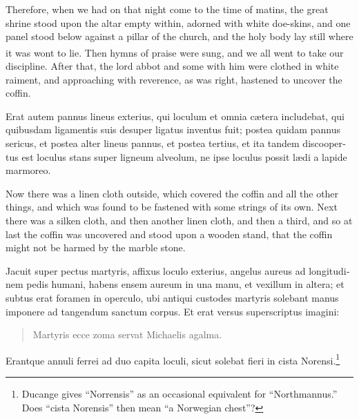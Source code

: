 \documentclass[10pt]{book}
\newcounter{engnote}
\newcommand{\engnotenum}{\textsuperscript{\arabic{engnote}\stepcounter{engnote}}}
\begin{document}
\begin{paracol}{2}
\switchcolumn

Therefore, when we had on that night come to the time of matins, the great shrine stood upon the altar empty within, adorned with white doe-skins, and one panel stood below against a pillar of the church, and the holy body lay still where it was wont to lie.\engnotenum{} Then hymns of praise were sung, and we all went to take our discipline. After that, the lord abbot and some with him were clothed in white raiment, and approaching with reverence, as was right, hastened to uncover the coffin.

\switchcolumn*

\begin{otherlanguage}{latin}
Erat autem pannus lineus exterius, qui loculum et omnia c\ae{}tera includebat, qui quibusdam ligamentis suis desuper ligatus inventus fuit; postea quidam pannus sericus, et postea alter lineus pannus, et postea tertius, et ita tandem discoopertus est loculus stans super ligneum alveolum, ne ipse loculus possit l\ae{}di a lapide marmoreo.
\end{otherlanguage}

\switchcolumn

Now there was a linen cloth outside, which covered the coffin and all the other things, and which was found to be fastened with some strings of its own. Next there was a silken cloth, and then another linen cloth, and then a third, and so at last the coffin was uncovered and stood upon a wooden stand, that the coffin might not be harmed by the marble stone.

\switchcolumn*

\begin{otherlanguage}{latin}
Jacuit super pectus martyris, affixus loculo exterius, angelus aureus ad longitudinem pedis humani, habens ensem aureum in una manu, et vexillum in altera; et subtus erat foramen in operculo, ubi antiqui custodes martyris solebant manus imponere ad tangendum sanctum corpus. Et erat versus superscriptus imagini:
\begin{verse}
Martyris ecce zoma servat Michaelis agalma.
\end{verse}
Erantque annuli ferrei ad duo capita loculi, sicut solebat fieri in cista Norensi.\footnote[\textdagger]{Ducange gives ``Norrensis'' as an occasional equivalent for ``Northmannus.'' Does ``cista Norensis'' then mean ``a Norwegian chest''?}
\end{otherlanguage}

\switchcolumn


\end{paracol}
\end{document}
